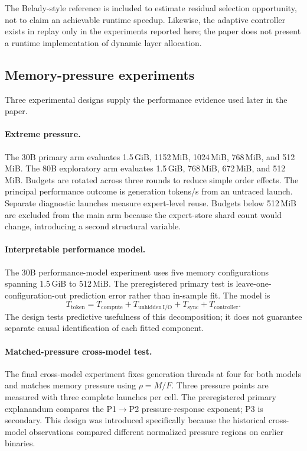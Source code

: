 The Belady-style reference is included to estimate residual selection opportunity, not to claim an achievable runtime speedup. Likewise, the adaptive controller exists in replay only in the experiments reported here; the paper does not present a runtime implementation of dynamic layer allocation.

\subsection{Memory-pressure experiments}

Three experimental designs supply the performance evidence used later in the paper.

\paragraph{Extreme pressure.}
The 30B primary arm evaluates 1.5\,GiB, 1152\,MiB, 1024\,MiB, 768\,MiB, and 512\,MiB. The 80B exploratory arm evaluates 1.5\,GiB, 768\,MiB, 672\,MiB, and 512\,MiB. Budgets are rotated across three rounds to reduce simple order effects. The principal performance outcome is generation tokens/s from an untraced launch. Separate diagnostic launches measure expert-level reuse. Budgets below 512\,MiB are excluded from the main arm because the expert-store shard count would change, introducing a second structural variable.

\paragraph{Interpretable performance model.}
The 30B performance-model experiment uses five memory configurations spanning 1.5\,GiB to 512\,MiB. The preregistered primary test is leave-one-configuration-out prediction error rather than in-sample fit. The model is
\begin{equation}
    T_{\mathrm{token}}
    =
    T_{\mathrm{compute}}
    +
    T_{\mathrm{unhidden\,I/O}}
    +
    T_{\mathrm{sync}}
    +
    T_{\mathrm{controller}} .
    \label{eq:latency-model}
\end{equation}
The design tests predictive usefulness of this decomposition; it does not guarantee separate causal identification of each fitted component.

\paragraph{Matched-pressure cross-model test.}
The final cross-model experiment fixes generation threads at four for both models and matches memory pressure using $\rho=M/F$. Three pressure points are measured with three complete launches per cell. The preregistered primary explanandum compares the P1$\rightarrow$P2 pressure-response exponent; P3 is secondary. This design was introduced specifically because the historical cross-model observations compared different normalized pressure regions on earlier binaries.

